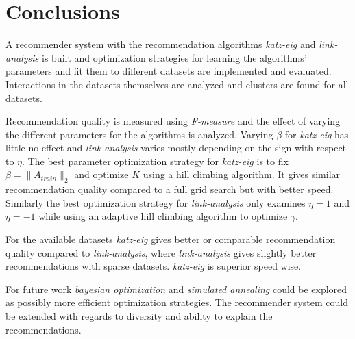 \chapter{Conclusions}\label{cha:conclusions}

A recommender system with the recommendation algorithms \textit{katz-eig} and \textit{link-analysis} is built and optimization strategies for learning the algorithms' parameters and fit them to different datasets are implemented and evaluated. Interactions in the datasets themselves are analyzed and clusters are found for all datasets.

Recommendation quality is measured using \textit{F-measure} and the effect of varying the different parameters for the algorithms is analyzed. Varying $\beta$ for \textit{katz-eig} has little no effect and \textit{link-analysis} varies mostly depending on the sign with respect to $\eta$. The best parameter optimization strategy for \textit{katz-eig} is to fix $\beta = \| A_{train}\|_2$ and optimize $K$ using a hill climbing algorithm. It gives similar recommendation quality compared to a full grid search but with better speed. Similarly the best optimization strategy for \textit{link-analysis} only examines $\eta = 1$ and $\eta = -1$ while using an adaptive hill climbing algorithm to optimize $\gamma$.

For the available datasets \textit{katz-eig} gives better or comparable recommendation quality compared to \textit{link-analysis}, where \textit{link-analysis} gives slightly better recommendations with sparse datasets. \textit{katz-eig} is superior speed wise.

For future work \textit{bayesian optimization} and \textit{simulated annealing} could be explored as possibly more efficient optimization strategies.  The recommender system could be extended with regards to diversity and ability to explain the recommendations.

